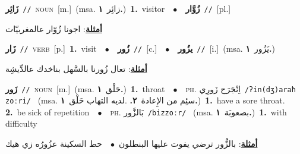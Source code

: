 \documentclass[10pt,a4paper,twoside]{article} %
\begin{document}
\begin{multicols}{2}
{\setlength\topsep{0pt}\textbf{\foreignlanguage{arabic}{زَائِر}}\ {\color{gray}\texttt{//}\color{black}}\ \textsc{noun}\ [m.]\ \color{gray}(msa. \foreignlanguage{arabic}{زائِر}~\foreignlanguage{arabic}{\textbf{١.}})\color{black}\ \textbf{1.}~visitor\ \ $\bullet$\ \ \setlength\topsep{0pt}\textbf{\foreignlanguage{arabic}{زُوَّار}}\ {\color{gray}\texttt{//}\color{black}}\ [pl.]\  \begin{flushright}\color{gray}\foreignlanguage{arabic}{\textbf{\underline{\foreignlanguage{arabic}{أمثلة}}}: اجونا زُوّار عالمغربيّات}\end{flushright}\color{black}} \vspace{2mm}

{\setlength\topsep{0pt}\textbf{\foreignlanguage{arabic}{زَار}}\ {\color{gray}\texttt{//}\color{black}}\ \textsc{verb}\ [p.]\ \textbf{1.}~visit\ \ $\bullet$\ \ \setlength\topsep{0pt}\textbf{\foreignlanguage{arabic}{زُور}}\ {\color{gray}\texttt{//}\color{black}}\ [c.]\ \ $\bullet$\ \ \setlength\topsep{0pt}\textbf{\foreignlanguage{arabic}{يزُور}}\ {\color{gray}\texttt{//}\color{black}}\ [i.]\ \color{gray}(msa. \foreignlanguage{arabic}{يَزُور}~\foreignlanguage{arabic}{\textbf{١.}})\color{black}\  \begin{flushright}\color{gray}\foreignlanguage{arabic}{\textbf{\underline{\foreignlanguage{arabic}{أمثلة}}}: تعال زُورنا بالسَّهل بناخدك عالدِّيشِة}\end{flushright}\color{black}} \vspace{2mm}

{\setlength\topsep{0pt}\textbf{\foreignlanguage{arabic}{زَور}}\ {\color{gray}\texttt{//}\color{black}}\ \textsc{noun}\ [m.]\ \color{gray}(msa. \foreignlanguage{arabic}{حَلْق}~\foreignlanguage{arabic}{\textbf{١.}})\color{black}\ \textbf{1.}~throat\ \ $\bullet$\ \ \textsc{ph.} \color{gray} \foreignlanguage{arabic}{اِنْجَرَح زَورِي}\color{black}\ {\color{gray}\texttt{/{\sffamily ʔin(dʒ)araħ zoːri}/}\color{black}}\ \color{gray} (msa. \foreignlanguage{arabic}{سئِم من الإِعادة}~\foreignlanguage{arabic}{\textbf{٢.}}  .\foreignlanguage{arabic}{لديه التهاب حَلْق}~\foreignlanguage{arabic}{\textbf{١.}})\color{black}\ \textbf{1.}~have a sore throat.  \textbf{2.}~be sick of repetition\ \ $\bullet$\ \ \textsc{ph.} \color{gray} \foreignlanguage{arabic}{بَالزَّور}\color{black}\ {\color{gray}\texttt{/{\sffamily bizzoːr}/}\color{black}}\ \color{gray} (msa. \foreignlanguage{arabic}{بصعوبَة}~\foreignlanguage{arabic}{\textbf{١.}})\color{black}\ \textbf{1.}~with difficulty\  \begin{flushright}\color{gray}\foreignlanguage{arabic}{\textbf{\underline{\foreignlanguage{arabic}{أمثلة}}}: بالزُّور ترضي يفوت عليها البنطلون\ $\bullet$\ \  حط السكينة عزُورُه زي هيك}\end{flushright}\color{black}} \vspace{2mm}


\end{multicols}
\end{document}
